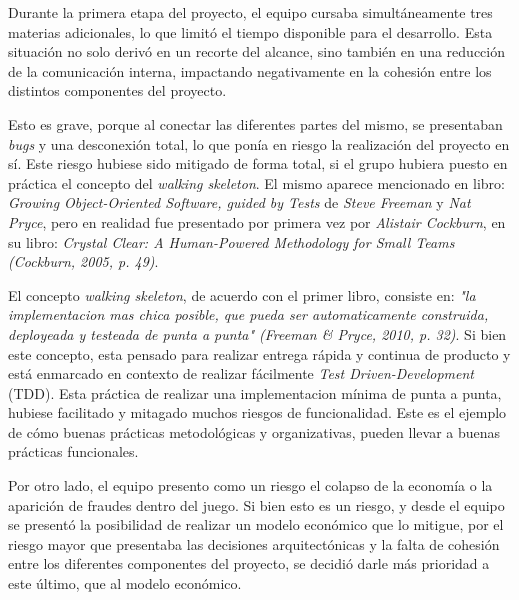 \vspace{0.25cm}

Durante la primera etapa del proyecto, el equipo cursaba simultáneamente tres materias adicionales, lo que 
limitó el tiempo disponible para el desarrollo. Esta situación no solo derivó en un recorte del alcance, 
sino también en una reducción de la comunicación interna, impactando negativamente en la cohesión entre 
los distintos componentes del proyecto.

\vspace{0.25cm}

Esto es grave, porque al conectar las diferentes partes del mismo, se presentaban \textit{bugs} y una desconexión total, lo 
que ponía en riesgo la realización del proyecto en sí. Este riesgo hubiese sido mitigado de forma total, si el grupo hubiera 
puesto en práctica el concepto del \textit{walking skeleton}. El mismo aparece mencionado en libro: 
\textit{Growing Object-Oriented Software, guided by Tests} de \textit{Steve Freeman} y \textit{Nat Pryce}, pero en realidad 
fue presentado por primera vez por \textit{Alistair Cockburn}, en su libro: \textit{Crystal Clear: A Human-Powered 
Methodology for Small Teams (Cockburn, 2005, p. 49)}.

\vspace{0.25cm}

El concepto \textit{walking skeleton}, de acuerdo con el primer libro, consiste en: \textit{"la implementacion mas chica 
posible, que pueda ser automaticamente construida, deployeada y testeada de punta a punta" (Freeman & Pryce, 2010, p. 32)}. 
Si bien este concepto, esta pensado para realizar entrega rápida y continua de producto y está enmarcado en contexto de 
realizar fácilmente \textit{Test Driven-Development} (TDD). Esta práctica de realizar una implementacion mínima de punta 
a punta, hubiese facilitado y mitagado muchos riesgos de funcionalidad. Este es el ejemplo de cómo buenas prácticas metodológicas 
y organizativas, pueden llevar a buenas prácticas funcionales.

\vspace{0.25cm}

Por otro lado, el equipo presento como un riesgo el colapso de la economía o la aparición de fraudes dentro del juego. Si
bien esto es un riesgo, y desde el equipo se presentó la posibilidad de realizar un modelo económico que lo mitigue, por el riesgo mayor
que presentaba las decisiones arquitectónicas y la falta de cohesión entre los diferentes componentes del proyecto, se 
decidió darle más prioridad a este último, que al modelo económico.

